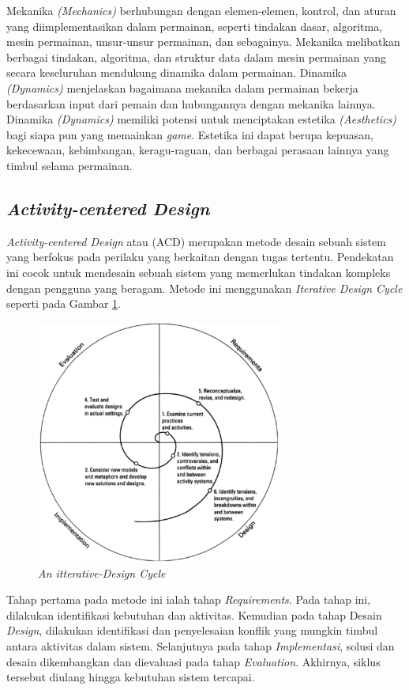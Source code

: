 Mekanika \textit{(Mechanics)} berhubungan dengan elemen-elemen, kontrol, dan aturan yang diimplementasikan dalam permainan, seperti tindakan dasar, algoritma, mesin permainan, unsur-unsur permainan, dan sebagainya.
Mekanika melibatkan berbagai tindakan, algoritma, dan struktur data dalam mesin permainan yang secara keseluruhan mendukung dinamika dalam permainan.
Dinamika \textit{(Dynamics)} menjelaskan bagaimana mekanika dalam permainan bekerja berdasarkan input dari pemain dan hubungannya dengan mekanika lainnya.
Dinamika \textit{(Dynamics)} memiliki potensi untuk menciptakan estetika \textit{(Aesthetics)} bagi siapa pun yang memainkan \textit{game}. Estetika ini dapat berupa kepuasan, kekecewaan, kebimbangan, keragu-raguan, dan berbagai perasaan lainnya yang timbul selama permainan.
\subsection{\textit{Activity-centered Design}}
\textit{Activity-centered Design} atau (ACD) merupakan metode desain sebuah sistem yang berfokus pada perilaku yang berkaitan dengan tugas tertentu.
Pendekatan ini cocok untuk mendesain sebuah sistem yang memerlukan tindakan kompleks dengan pengguna yang beragam. Metode ini menggunakan \textit{Iterative Design Cycle} seperti pada Gambar \ref*{Fig:itterative-Design Cycle}.
\begin{figure}[H]
	\centering
	\includegraphics[height=8cm]{contents/chapter-2/images/Itterative-design.png}
	\caption{\textit{An itterative-Design Cycle} \cite{2004activity}}
	\label{Fig:itterative-Design Cycle}
\end{figure}
Tahap pertama pada metode ini ialah tahap \textit{Requirements}. Pada tahap ini, dilakukan identifikasi kebutuhan dan aktivitas. 
Kemudian pada tahap Desain \textit{Design}, dilakukan identifikasi dan penyelesaian konflik yang mungkin timbul antara aktivitas dalam sistem.
Selanjutnya pada tahap \textit{Implementasi}, solusi dan desain dikembangkan dan dievaluasi pada tahap \textit{Evaluation}.
Akhirnya, siklus tersebut diulang hingga kebutuhan sistem tercapai.
